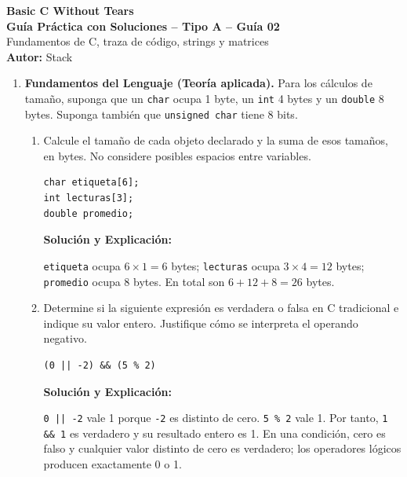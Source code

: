 \documentclass[11pt,letterpaper]{article}
\begin{document}
\begin{center}
    {\LARGE \textbf{Basic C Without Tears}} \\[0.25cm]
    {\Large \textbf{Guía Práctica con Soluciones -- Tipo A -- Guía 02}} \\[0.15cm]
    \small Fundamentos de C, traza de código, strings y matrices \\[0.1cm]
    \textbf{Autor:} Stack
\end{center}
\vspace{0.3cm}

\begin{enumerate}[label=\textbf{\arabic*.}]
    \item \textbf{Fundamentos del Lenguaje (Teoría aplicada).}
    Para los cálculos de tamaño, suponga que un \texttt{char} ocupa 1 byte, un \texttt{int} 4 bytes y un \texttt{double} 8 bytes. Suponga también que \texttt{unsigned char} tiene 8 bits.
    \begin{enumerate}[label=(\alph*)]
        \item Calcule el tamaño de cada objeto declarado y la suma de esos tamaños, en bytes. No considere posibles espacios entre variables.
        \begin{lstlisting}[style=customc,numbers=none]
char etiqueta[6];
int lecturas[3];
double promedio;
        \end{lstlisting}
        \begin{solucionbox}
        \textbf{Solución y Explicación:}\par
        \texttt{etiqueta} ocupa $6\times1=6$ bytes; \texttt{lecturas} ocupa $3\times4=12$ bytes; \texttt{promedio} ocupa 8 bytes. En total son $6+12+8=26$ bytes.
        \end{solucionbox}
        \item Determine si la siguiente expresión es verdadera o falsa en C tradicional e indique su valor entero. Justifique cómo se interpreta el operando negativo.
        \begin{lstlisting}[style=customc,numbers=none]
(0 || -2) && (5 % 2)
        \end{lstlisting}
        \begin{solucionbox}
        \textbf{Solución y Explicación:}\par
        \texttt{0 || -2} vale 1 porque \texttt{-2} es distinto de cero. \texttt{5 \% 2} vale 1. Por tanto, \texttt{1 \&\& 1} es verdadero y su resultado entero es 1.
        En una condición, cero es falso y cualquier valor distinto de cero es verdadero; los operadores lógicos producen exactamente 0 o 1.

\end{solucionbox}
\end{enumerate}
\end{enumerate}
\end{document}
